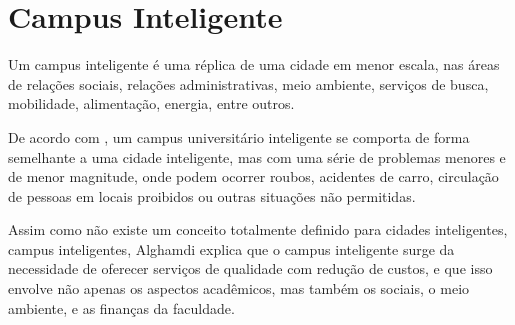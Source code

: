 \section{Campus Inteligente}

Um campus inteligente é uma réplica de uma cidade em menor escala, nas áreas de relações sociais, relações administrativas, meio ambiente, serviços de busca, mobilidade, alimentação, energia, entre outros.

De acordo com , um campus universitário inteligente se comporta de forma semelhante a uma cidade inteligente, mas com uma série de problemas menores e de menor magnitude, onde podem ocorrer roubos, acidentes de carro, circulação de pessoas em locais proibidos ou outras situações não permitidas.

Assim como não existe um conceito totalmente definido para cidades inteligentes, campus inteligentes, Alghamdi explica que o campus inteligente surge da necessidade de oferecer serviços de qualidade com redução de custos, e que isso envolve não apenas os aspectos acadêmicos, mas também os sociais, o meio ambiente, e as finanças da faculdade.


